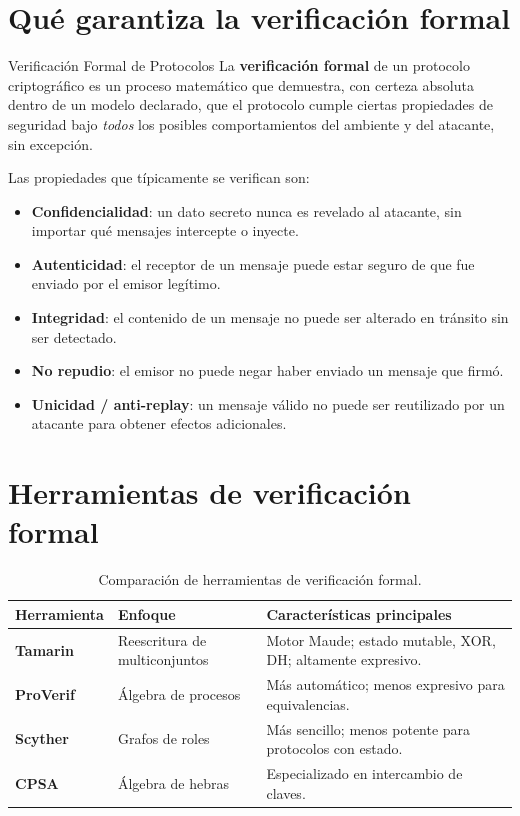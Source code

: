 \documentclass[12pt, a4paper, twoside, openright]{book}
\begin{document}
\section{Qu\'e garantiza la verificaci\'on formal}

\begin{cajaDef}{Verificaci\'on Formal de Protocolos}
  La \textbf{verificaci\'on formal} de un protocolo criptogr\'afico
  es un proceso matem\'atico que demuestra, con certeza absoluta dentro
  de un modelo declarado, que el protocolo cumple ciertas propiedades
  de seguridad bajo \emph{todos} los posibles comportamientos del
  ambiente y del atacante, sin excepci\'on.
\end{cajaDef}

\medskip

Las propiedades que t\'ipicamente se verifican son:
\begin{itemize}[leftmargin=*, itemsep=4pt]
  \item \textbf{Confidencialidad}: un dato secreto nunca es revelado
    al atacante, sin importar qu\'e mensajes intercepte o inyecte.
  \item \textbf{Autenticidad}: el receptor de un mensaje puede estar
    seguro de que fue enviado por el emisor leg\'itimo.
  \item \textbf{Integridad}: el contenido de un mensaje no puede ser
    alterado en tr\'ansito sin ser detectado.
  \item \textbf{No repudio}: el emisor no puede negar haber enviado
    un mensaje que firm\'o.
  \item \textbf{Unicidad / anti-replay}: un mensaje v\'alido no puede
    ser reutilizado por un atacante para obtener efectos adicionales.
\end{itemize}

\section{Herramientas de verificaci\'on formal}

\begin{table}[H]
\centering
\caption{Comparaci\'on de herramientas de verificaci\'on formal.}
\label{tab:herramientas}
\begin{tabularx}{\textwidth}{>{\bfseries}p{3.2cm} X X}
\toprule
Herramienta & Enfoque & Caracter\'isticas principales \\
\midrule
\textbf{Tamarin} & Reescritura de multiconjuntos &
  Motor Maude; estado mutable, XOR, DH; altamente expresivo.\\[4pt]
ProVerif & \'Algebra de procesos &
  M\'as autom\'atico; menos expresivo para equivalencias.\\[4pt]
Scyther & Grafos de roles &
  M\'as sencillo; menos potente para protocolos con estado.\\[4pt]
CPSA & \'Algebra de hebras &
  Especializado en intercambio de claves.\\
\bottomrule
\end{tabularx}
\end{table}
\end{document}
